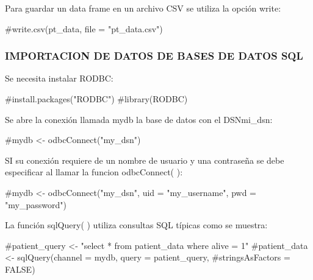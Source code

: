 \documentclass[
  letterpaper,
  DIV=11,
  numbers=noendperiod]{scrartcl}
\newenvironment{Shaded}{\begin{snugshade}}{\end{snugshade}}
\newcommand{\CommentTok}[1]{\textcolor[rgb]{0.37,0.37,0.37}{#1}}
\begin{document}
Para guardar un data frame en un archivo CSV se utiliza la opción write:

\begin{Shaded}
\begin{Highlighting}[]
\CommentTok{\#write.csv(pt\_data, file = "pt\_data.csv")}
\end{Highlighting}
\end{Shaded}

\hypertarget{importacion-de-datos-de-bases-de-datos-sql}{%
\subsubsection{IMPORTACION DE DATOS DE BASES DE DATOS
SQL}\label{importacion-de-datos-de-bases-de-datos-sql}}

Se necesita instalar RODBC:

\begin{Shaded}
\begin{Highlighting}[]
\CommentTok{\#install.packages("RODBC")}
\CommentTok{\#library(RODBC)}
\end{Highlighting}
\end{Shaded}

Se abre la conexión llamada mydb la base de datos con el DSNmi\_dsn:

\begin{Shaded}
\begin{Highlighting}[]
\CommentTok{\#mydb \textless{}{-} odbcConnect("my\_dsn")}
\end{Highlighting}
\end{Shaded}

SI su conexión requiere de un nombre de usuario y una contraseña se debe
especificar al llamar la funcion odbcConnect( ):

\begin{Shaded}
\begin{Highlighting}[]
\CommentTok{\#mydb \textless{}{-} odbcConnect("my\_dsn", uid = "my\_username", pwd = "my\_password")}
\end{Highlighting}
\end{Shaded}

La función sqlQuery( ) utiliza consultas SQL típicas como se muestra:

\begin{Shaded}
\begin{Highlighting}[]
\CommentTok{\#patient\_query \textless{}{-} "select * from patient\_data where alive = 1"}
\CommentTok{\#patient\_data \textless{}{-} sqlQuery(channel = mydb, query = patient\_query, \#stringsAsFactors = FALSE)}
\end{Highlighting}
\end{Shaded}
\end{document}
